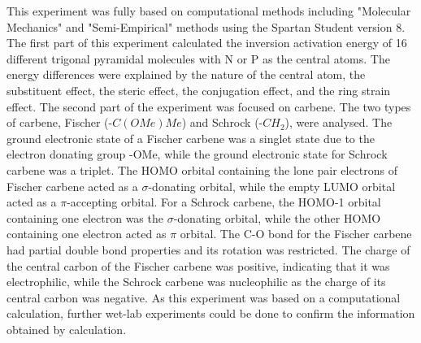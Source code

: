 \documentclass[twocolumn]{article} %
\begin{document}
This experiment was fully based on computational methods including "Molecular Mechanics" and "Semi-Empirical" methods using the Spartan Student version 8. The first part of this experiment calculated the inversion activation energy of 16 different trigonal pyramidal molecules with N or P as the central atoms. The energy differences were explained by the nature of the central atom, the substituent effect, the steric effect, the conjugation effect, and the ring strain effect. The second part of the experiment was focused on carbene. The two types of carbene, Fischer (-$C(OMe)Me$) and Schrock (-$CH_2$), were analysed. The ground electronic state of a Fischer carbene was a singlet state due to the electron donating group -OMe, while the ground electronic state for Schrock carbene was a triplet. The HOMO orbital containing the lone pair electrons of Fischer carbene acted as a $\sigma$-donating orbital, while the empty LUMO orbital acted as a $\pi$-accepting orbital. For a Schrock carbene, the HOMO-1 orbital containing one electron was the $\sigma$-donating orbital, while the other HOMO containing one electron acted as $\pi$ orbital. The C-O bond for the Fischer carbene had partial double bond properties and its rotation was restricted. The charge of the central carbon of the Fischer carbene was positive, indicating that it was electrophilic, while the Schrock carbene was nucleophilic as the charge of its central carbon was negative. As this experiment was based on a computational calculation, further wet-lab experiments could be done to confirm the information obtained by calculation.









\end{document}
